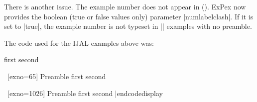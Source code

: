 There is another issue.  The example number does not appear in
().  ExPex now provides the boolean (true or false
values only) parameter |numlabelclash|.  If it is set to |true|,
the example number is not typeset in |\pex| examples with no
preamble.

The code used for the IJAL examples above was:
\codedisplay
{}

\pex
\a first
\a second
\xe

\pex~[exno=65]
Preamble
\a first
\a second
\xe

\pex~[exno=1026]
Preamble
\a first
\a second
\xe
|endcodedisplay

\endgroup



